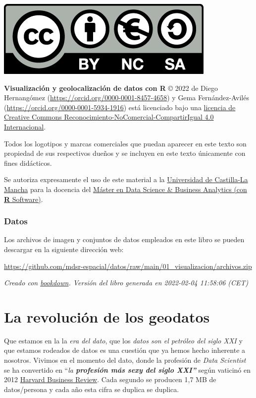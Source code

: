 \documentclass[
]{book}
\theoremstyle{definition}
\theoremstyle{definition}
\theoremstyle{definition}
\theoremstyle{definition}
\theoremstyle{remark}
\begin{document}
\begin{center}\includegraphics[width=0.25\linewidth]{img/by-nc-sa.eu} \end{center}

\textbf{Visualización y geolocalización de datos con R} © 2022 de Diego Hernangómez (\url{https://orcid.org/0000-0001-8457-4658}) y Gema
Fernández-Avilés (\url{https://orcid.org/0000-0001-5934-1916})
está licenciado bajo una \href{http://creativecommons.org/licenses/by-nc-sa/4.0/}{licencia de Creative Commons
Reconocimiento-NoComercial-CompartirIgual 4.0
Internacional}.

Todos los logotipos y marcas comerciales que puedan aparecer en este texto son
propiedad de sus respectivos dueños y se incluyen en este texto únicamente con
fines didácticos.

Se autoriza expresamente el uso de este material a la \href{https://www.uclm.es/}{Universidad de
Castilla-La Mancha} para la docencia del \href{https://blog.uclm.es/tp-mbsba/}{Máster en Data
Science \& Business Analytics (con \textbf{R}
Software)}.

\hypertarget{datos}{%
\subsection*{Datos}\label{datos}}

Los archivos de imagen y conjuntos de datos empleados en este libro se pueden
descargar en la siguiente dirección web:

\url{https://github.com/mdsr-espacial/datos/raw/main/01_visualizacion/archivos.zip}

\emph{Creado con \href{https://bookdown.org/}{bookdown}. Versión del libro generada en
2022-02-04 11:58:06 (CET)}

\hypertarget{la-revoluciuxf3n-de-los-geodatos}{%
\chapter{La revolución de los geodatos}\label{la-revoluciuxf3n-de-los-geodatos}}

Que estamos en la la \emph{era del dato}, que los \emph{datos son el petróleo del siglo
XXI} y que estamos rodeados de datos es una cuestión que ya hemos hecho
inherente a nosotros. Vivimos en el momento del dato, donde la profesión de
\emph{Data Scientist} se ha convertido en ``\emph{la \textbf{profesión más sexy del siglo XXI''}}
según vaticinó en 2012 \href{https://hbr.org/2012/10/data-scientist-the-sexiest-job-of-the-21st-century}{Harvard Business
Review}.
Cada segundo se producen 1,7 MB de datos/persona y cada año esta cifra se
duplica se duplica.
\end{document}
